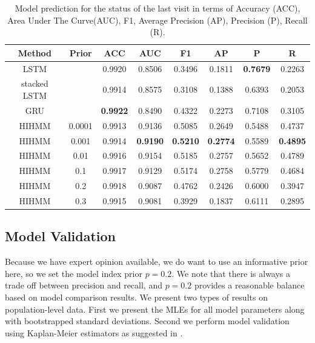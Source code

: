 \documentclass{article}
\begin{document}
\begin{table}[ht!]
	\centering
	\caption{Model prediction for the status of the last visit in terms of Accuracy (ACC), Area Under The Curve(AUC), F1, Average Precision (AP), Precision (P), Recall (R).}
	\begin{tabular}{|c|c|c|c|c|c|c|c|}
		\hline
		Method & Prior & ACC & AUC & F1 & AP & P & R \\
		\hline
		LSTM &  & 0.9920 & 0.8506 & 0.3496 & 0.1811 & \textbf{0.7679} & 0.2263 \\
		\hline
		stacked LSTM &  & 0.9914 & 0.8575 & 0.3108 & 0.1388 & 0.6393 & 0.2053 \\
		\hline
		GRU &  & \textbf{0.9922} & 0.8490 & 0.4322 & 0.2273 & 0.7108 & 0.3105 \\
		\hline
		HIHMM & 0.0001 & 0.9913 & 0.9136 & 0.5085 & 0.2649 & 0.5488 & 0.4737 \\
		\hline
		HIHMM & 0.001 & 0.9914 & \textbf{0.9190} & \textbf{0.5210} & \textbf{0.2774} & 0.5589 & \textbf{0.4895} \\
		\hline
		HIHMM & 0.01 & 0.9916 & 0.9154 & 0.5185 & 0.2757 & 0.5652 & 0.4789 \\
		\hline
		HIHMM & 0.1 & 0.9917 & 0.9129 & 0.5174 & 0.2758 & 0.5779 & 0.4684 \\
		\hline
		HIHMM & 0.2 & 0.9918 & 0.9087 & 0.4762 & 0.2426 & 0.6000 & 0.3947 \\
		\hline
		HIHMM & 0.3 & 0.9915 & 0.9081 & 0.3929 & 0.1837 & 0.6111 & 0.2895 \\
		\hline
	\end{tabular}
	\label{Model_Comparison}
\end{table}


\subsection{Model Validation}
Because we have expert opinion available, we do want to use an informative prior here, so we set the model index prior $p = 0.2$. We note that there is always a trade off between precision and recall, and $p = 0.2$ provides a reasonable balance based on model comparison results. We present two types of results on population-level data. First we present the MLEs for all model parameters along with bootstrapped standard deviations. Second we perform model validation using Kaplan-Meier estimators as suggested in \cite{titman_general_2008}.
\end{document}
